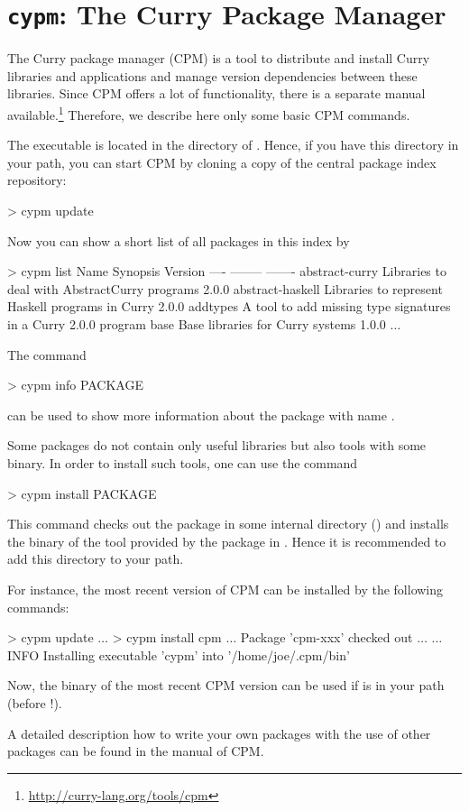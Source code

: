 \section{\texttt{cypm}: The Curry Package Manager}
\label{sec-cpm}

The Curry package manager (CPM) is a tool to
distribute and install Curry libraries and applications
and manage version dependencies between these libraries.
Since CPM offers a lot of functionality, there is a separate
manual available.\footnote{\url{http://curry-lang.org/tools/cpm}}
Therefore, we describe here only some basic CPM commands.

The executable  is located in the  directory
of \CYS. Hence, if you have this directory in your path,
you can start CPM by cloning a copy of the central package index repository:
%
\begin{curry}
> cypm update
\end{curry}
%
Now you can show a short list of all packages in this index by
%
\begin{curry}
> cypm list
Name               Synopsis                                           Version   
----               --------                                           -------   
abstract-curry     Libraries to deal with AbstractCurry programs      2.0.0     
abstract-haskell   Libraries to represent Haskell programs in Curry   2.0.0     
addtypes           A tool to add missing type signatures in a Curry   2.0.0     
                   program                                           
base               Base libraries for Curry systems                   1.0.0     
$\ldots$
\end{curry}
%
The command
%
\begin{curry}
> cypm info PACKAGE
\end{curry}
%
can be used to show more information about the package with name
.

Some packages do not contain only useful libraries
but also tools with some binary. In order to install such tools,
one can use the command
%
\begin{curry}
> cypm install PACKAGE
\end{curry}
%
This command checks out the package in some internal directory
()
and installs the binary of the tool provided by the package
in .
Hence it is recommended to add this directory to your path.

For instance, the most recent version of CPM
can be installed by the following commands:
%
\begin{curry}
> cypm update
$\ldots$
> cypm install cpm
$\ldots$ Package 'cpm-xxx' checked out $\ldots$
$\ldots$
INFO  Installing executable 'cypm' into '/home/joe/.cpm/bin'
\end{curry}
%
Now, the binary  of the most recent CPM version can be used
if  is in your path
(before !).

A detailed description how to write your own packages
with the use of other packages can be found in the manual of CPM.

